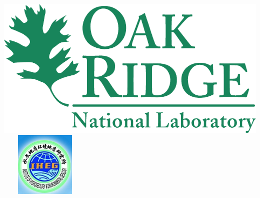 \begin{center}
\includegraphics[scale=0.15]{./logos/ORNLlogo} \ \ \ \ 
\includegraphics[scale=0.25]{./logos/IHEG.png}
\end{center}

